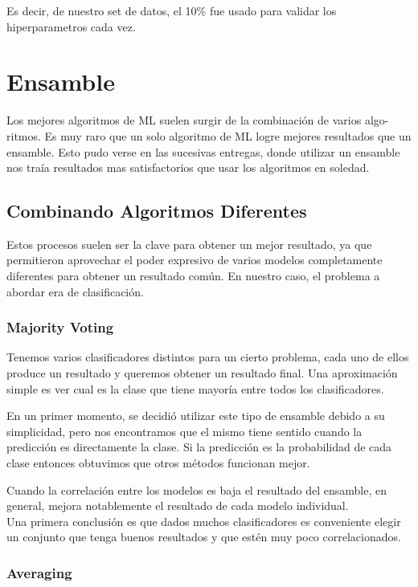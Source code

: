 \documentclass[a4paper ,12pt]{article}
\begin{document}
Es decir, de nuestro set de datos, el 10\% fue usado para validar los hiperparametros cada vez.


\newpage
\section{Ensamble}

Los mejores algoritmos de ML suelen surgir de la combinación de varios algo-
ritmos. Es muy raro que un solo algoritmo de ML logre mejores resultados que
un ensamble. Esto pudo verse en las sucesivas entregas, donde utilizar un ensamble nos traía
resultados mas satisfactorios que usar los algoritmos en soledad.

\subsection{Combinando Algoritmos Diferentes}

Estos procesos suelen ser la clave para obtener un mejor resultado, ya que permitieron aprovechar el poder expresivo
de varios modelos completamente diferentes para obtener un resultado común.
En nuestro caso, el problema a abordar era de clasificación.

\subsubsection{Majority Voting}

Tenemos varios clasificadores distintos para un cierto problema, cada uno de ellos produce un resultado y queremos obtener un 
 resultado final. Una aproximación simple es ver cual es la clase que tiene mayoría entre todos los clasificadores.

En un primer momento, se decidió utilizar este tipo de ensamble debido a su simplicidad, 
pero nos encontramos que el mismo tiene sentido cuando la predicción es directamente la clase.
Si la predicción es la probabilidad de cada clase entonces obtuvimos que otros métodos funcionan mejor. 

Cuando la correlación entre los modelos es baja el resultado del ensamble, en general, mejora notablemente el resultado de cada modelo individual. 
\\

Una primera conclusión es que dados muchos clasificadores es conveniente elegir un conjunto que tenga buenos resultados y que estén muy poco correlacionados.

\subsubsection{Averaging}
\end{document}

